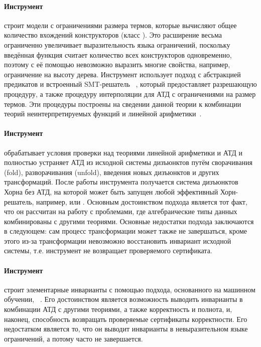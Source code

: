 \paragraph{Инструмент \eldarica{}~\cite{8603013}} строит модели с ограничениями размера термов, которые вычисляют общее количество вхождений конструкторов (класс \sizeelemclass{}). Это расширение весьма ограниченно увеличивает выразительность языка ограничений, поскольку введённая функция считает количество всех конструкторов одновременно, поэтому с её помощью невозможно выразить многие свойства, например, ограничение на высоту дерева. Инструмент \eldarica{} использует подход \cegar{} с абстракцией предикатов и встроенный SMT-решатель \princess{}~\cite{princess}, который предоставляет разрешающую процедуру, а также процедуру интерполяции для АТД с ограничениями на размер термов. Эти процедуры построены на сведении данной теории к комбинации теорий неинтерпретируемых функций и линейной арифметики~\cite{hojjat2017deciding}.

\paragraph{Инструмент \vericat{}~\cite{10.1093/logcom/exab090,pettorossi_proietti_2022,10.1007/978-3-030-51074-9_6,angelis_fioravanti_pettorossi_proietti_2018}} обрабатывает условия проверки над теориями линейной арифметики и АТД и полностью устраняет АТД из исходной системы дизъюнктов путём сворачивания (fold), разворачивания (unfold), введения новых дизъюнктов и других трансформаций. После работы инструмента получается система дизъюнктов Хорна без АТД, на которой может быть запущен любой эффективный Хорн-решатель, например, \spacer{} или \eldarica{}. Основным достоинством подхода является тот факт, что он рассчитан на работу с проблемами, где алгебраические типы данных комбинированы с другими теориями. Основные недостатки подхода заключаются в следующем: сам процесс трансформации может также не завершаться, кроме этого из-за трансформации невозможно восстановить инвариант исходной системы, т.е. инструмент не возвращает проверяемого сертификата.

\paragraph{Инструмент \hoice{}~\cite{10.1007/978-3-030-02768-1_8}} строит элементарные инварианты с помощью подхода, основанного на машинном обучении, \ice{}~\cite{10.1007/978-3-319-08867-9_5}. Его достоинством является возможность выводить инварианты в комбинации АТД с другими теориями, а также корректность и полнота, и, наконец, способность возвращать проверяемые сертификаты корректности. Его недостатком является то, что он выводит инварианты в невыразительном языке ограничений, а потому часто не завершается.

